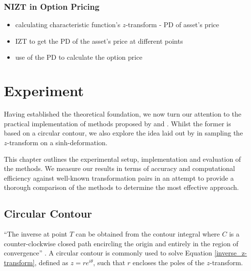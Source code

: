 \documentclass[a4paper]{report}
\begin{document}
\subsection{NIZT in Option Pricing}
\begin{itemize}
    \item calculating characteristic function's $z$-transform - PD of asset's price
    \item IZT to get the PD of the asset's price at different points
    \item use of the PD to calculate the option price
\end{itemize}
\chapter{Experiment}
Having established the theoretical foundation, we now turn our attention to the practical implementation of methods proposed by \citet{AbateWhitt1992a, AbateWhitt1992b} and \citet{Cavers1978FFT}. Whilst the former is based on a circular contour, we also explore the idea laid out by \citet{levendorskii2022sinh} in sampling the $z$-transform on a sinh-deformation.

This chapter outlines the experimental setup, implementation and evaluation of the methods. We measure our results in terms of accuracy and computational efficiency against well-known transformation pairs in an attempt to provide a thorough comparison of the methods to determine the most effective approach.

\section{Circular Contour}
``The inverse at point $T$ can be obtained from the contour integral where $C$ is a counter-clockwise closed path encircling the origin and entirely in the region of convergence'' \citep{horvath2020numerical}. A circular contour is commonly used to solve Equation \ref{inverse_z-transform}, defined as $z = re^{i\theta}$, such that $r$ encloses the poles of the $z$-transform. 
\end{document}

